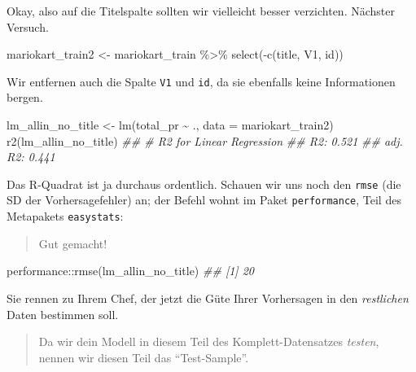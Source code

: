 \documentclass[
  letterpaper,
  twoside,
  open=any]{scrbook}
\newenvironment{Shaded}{\begin{snugshade}}{\end{snugshade}}
\newcommand{\AttributeTok}[1]{\textcolor[rgb]{0.40,0.45,0.13}{#1}}
\newcommand{\DocumentationTok}[1]{\textcolor[rgb]{0.37,0.37,0.37}{\textit{#1}}}
\newcommand{\FunctionTok}[1]{\textcolor[rgb]{0.28,0.35,0.67}{#1}}
\newcommand{\NormalTok}[1]{\textcolor[rgb]{0.00,0.23,0.31}{#1}}
\newcommand{\OtherTok}[1]{\textcolor[rgb]{0.00,0.23,0.31}{#1}}
\newcommand{\SpecialCharTok}[1]{\textcolor[rgb]{0.37,0.37,0.37}{#1}}
\theoremstyle{definition}
\theoremstyle{definition}
\theoremstyle{definition}
\theoremstyle{remark}
\begin{document}
Okay, also auf die Titelspalte sollten wir vielleicht besser verzichten.
Nächster Versuch.

\begin{Shaded}
\begin{Highlighting}[]
\NormalTok{mariokart\_train2 }\OtherTok{\textless{}{-}}
\NormalTok{  mariokart\_train }\SpecialCharTok{\%\textgreater{}\%} 
  \FunctionTok{select}\NormalTok{(}\SpecialCharTok{{-}}\FunctionTok{c}\NormalTok{(title, V1, id))}
\end{Highlighting}
\end{Shaded}

Wir entfernen auch die Spalte \texttt{V1} und \texttt{id}, da sie
ebenfalls keine Informationen bergen.

\begin{Shaded}
\begin{Highlighting}[]
\NormalTok{lm\_allin\_no\_title }\OtherTok{\textless{}{-}} \FunctionTok{lm}\NormalTok{(total\_pr }\SpecialCharTok{\textasciitilde{}}\NormalTok{ ., }\AttributeTok{data =}\NormalTok{ mariokart\_train2)}
\FunctionTok{r2}\NormalTok{(lm\_allin\_no\_title) }
\DocumentationTok{\#\# \# R2 for Linear Regression}
\DocumentationTok{\#\#        R2: 0.521}
\DocumentationTok{\#\#   adj. R2: 0.441}
\end{Highlighting}
\end{Shaded}

Das R-Quadrat ist ja durchaus ordentlich. Schauen wir uns noch den
\texttt{rmse} (die SD der Vorhersagefehler) an; der Befehl wohnt im
Paket \texttt{performance}, Teil des Metapakets \texttt{easystats}:

\begin{quote}
{} Gut gemacht!
\end{quote}

\begin{Shaded}
\begin{Highlighting}[]
\NormalTok{performance}\SpecialCharTok{::}\FunctionTok{rmse}\NormalTok{(lm\_allin\_no\_title)}
\DocumentationTok{\#\# [1] 20}
\end{Highlighting}
\end{Shaded}

Sie rennen zu Ihrem Chef, der jetzt die Güte Ihrer Vorhersagen in den
\emph{restlichen} Daten bestimmen soll.

\begin{quote}
{} Da wir dein Modell in diesem Teil des
Komplett-Datensatzes \emph{testen}, nennen wir diesen Teil das
\enquote{Test-Sample}.
\end{quote}
\end{document}
